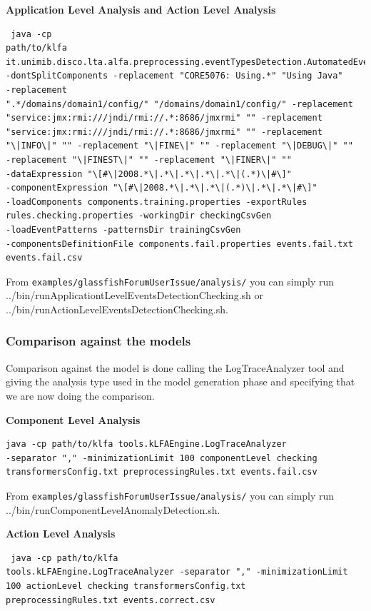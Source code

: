 \textbf{Application Level Analysis and Action Level Analysis}

\begin{verbatim}
 java -cp
path/to/klfa
it.unimib.disco.lta.alfa.preprocessing.eventTypesDetection.AutomatedEventTypesDetector
-dontSplitComponents -replacement "CORE5076: Using.*" "Using Java"
-replacement
".*/domains/domain1/config/" "/domains/domain1/config/" -replacement
"service:jmx:rmi:///jndi/rmi://.*:8686/jmxrmi" "" -replacement
"service:jmx:rmi:///jndi/rmi://.*:8686/jmxrmi" "" -replacement
"\|INFO\|" "" -replacement "\|FINE\|" "" -replacement "\|DEBUG\|" ""
-replacement "\|FINEST\|" "" -replacement "\|FINER\|" ""
-dataExpression "\[#\|2008.*\|.*\|.*\|.*\|.*\|(.*)\|#\]"
-componentExpression "\[#\|2008.*\|.*\|.*\|(.*)\|.*\|.*\|#\]" 
-loadComponents components.training.properties -exportRules
rules.checking.properties -workingDir checkingCsvGen
-loadEventPatterns -patternsDir trainingCsvGen
-componentsDefinitionFile components.fail.properties events.fail.txt
events.fail.csv

\end{verbatim}

From \texttt{examples/glassfishForumUserIssue/analysis/} you can simply run
../bin/runApplicationtLevelEventsDetectionChecking.sh or
../bin/runActionLevelEventsDetectionChecking.sh.

\subsubsection{Comparison against the models}

Comparison against the model is done calling the LogTraceAnalyzer
tool and giving the analysis type used in the model generation phase
and specifying that we are now doing the comparison.

\textbf{Component Level Analysis}

\begin{verbatim}
java -cp path/to/klfa tools.kLFAEngine.LogTraceAnalyzer
-separator "," -minimizationLimit 100 componentLevel checking
transformersConfig.txt preprocessingRules.txt events.fail.csv
\end{verbatim}

From \texttt{examples/glassfishForumUserIssue/analysis/} you can simply run
../bin/runComponentLevelAnomalyDetection.sh.

\textbf{Action Level Analysis}

\begin{verbatim}
 java -cp path/to/klfa
tools.kLFAEngine.LogTraceAnalyzer -separator "," -minimizationLimit
100 actionLevel checking transformersConfig.txt
preprocessingRules.txt events.correct.csv
\end{verbatim}

